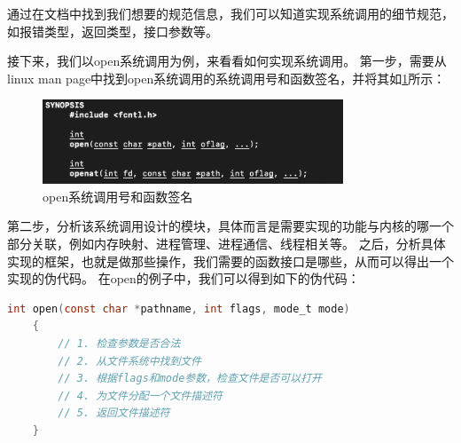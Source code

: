 通过在文档中找到我们想要的规范信息，我们可以知道实现系统调用的细节规范，如报错类型，返回类型，接口参数等。

接下来，我们以open系统调用为例，来看看如何实现系统调用。
第一步，需要从linux man page中找到open系统调用的系统调用号和函数签名，并将其如\ref{fig:opensyscall1}所示：
\begin{figure}[H]
  \centering
  \includegraphics[width=0.8\textwidth]{figures/09-03-open系统调用签名.png}
  \caption{open系统调用号和函数签名}
  \label{fig:opensyscall1}
\end{figure}

第二步，分析该系统调用设计的模块，具体而言是需要实现的功能与内核的哪一个部分关联，例如内存映射、进程管理、进程通信、线程相关等。
之后，分析具体实现的框架，也就是做那些操作，我们需要的函数接口是哪些，从而可以得出一个实现的伪代码。
在open的例子中，我们可以得到如下的伪代码：
\begin{lstlisting}[language=c]
    int open(const char *pathname, int flags, mode_t mode)
    {
        // 1. 检查参数是否合法
        // 2. 从文件系统中找到文件
        // 3. 根据flags和mode参数，检查文件是否可以打开
        // 4. 为文件分配一个文件描述符
        // 5. 返回文件描述符
    }
\end{lstlisting}

